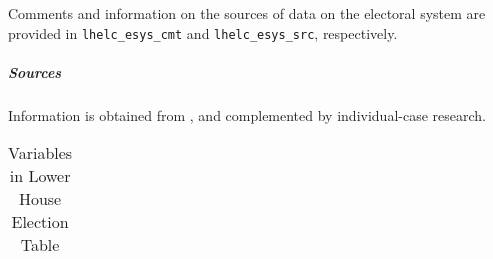 Comments and information on the sources of data on the electoral system are provided in \texttt{\footnotesize lhelc\_esys\_cmt} and \texttt{\footnotesize lhelc\_esys\_src}, respectively.

\subparagraph{Sources} Information is obtained  from \citet{Nohlen2001, Nohlen2005, Nohlen2010}, and complemented by individual-case research.


\begin{center}%
\begin{longtable}{L{4cm} L{6cm} L{3cm}}%
\caption{Variables in Lower House Election Table}\label{tab_lh_election}


\end{longtable}
\end{center}%
